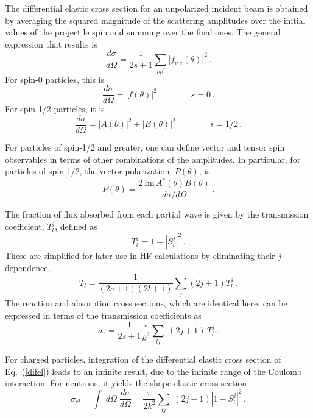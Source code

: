 \documentclass[twocolumn,amsmath,amssymb,10pt,groupedaddress,a4paper]{revtex4}
\begin{document}
The differential elastic cross section for an unpolarized incident
beam is obtained by averaging the squared magnitude of the scattering
amplitudes over the initial values of the projectile spin and summing
over the final ones. The general expression that results is \begin{equation}
\frac{d\sigma}{d\Omega}=\frac{1}{2s+1}\sum_{\nu\nu^{\prime}}\left|f_{\nu^{\prime}\nu}(\theta)\right|^{2}\,.\label{difel}\end{equation}
 For spin-0 particles, this is \begin{equation}
\frac{d\sigma}{d\Omega}=\left|f(\theta)\right|^{2}\qquad\qquad s=0\,.\end{equation}
 For spin-1/2 particles, it is \begin{equation}
\frac{d\sigma}{d\Omega}=\left|A(\theta)\right|^{2}+\left|B(\theta)\right|^{2}\qquad\qquad s=1/2\,.\end{equation}

For particles of spin-1/2 and greater, one can define vector and tensor
spin observables in terms of other combinations of the amplitudes.
In particular, for particles of spin-1/2, the vector polarization,
$P(\theta)$, is \begin{equation}
P(\theta)=\frac{2\,\textrm{Im}\, A^{*}(\theta)B(\theta)}{d\sigma/d\Omega}\,.\end{equation}

The fraction of flux absorbed from each partial wave is given by the
transmission coefficient, $T_{l}^{j}$, defined as \begin{equation}
T_{l}^{j}=1-\left|S_{l}^{j}\right|^{2}\,.\end{equation}
These are simplified for later use in HF calculations by eliminating
their $j$ dependence, \begin{equation}
T_{l}=\frac{1}{(2s+1)(2l+1)}\sum_j (2j+1) T_{l}^{j}\,.\end{equation}
The reaction and absorption cross sections, which are identical here,
can be expressed in terms of the transmission coefficients as \begin{equation}
\sigma_{r}=\frac{1}{2s+1}\frac{\pi}{k^{2}}\sum_{lj}\;(2j+1)\, T_{l}^{j}\,.\end{equation}

For charged particles, integration of the differential elastic cross
section of Eq.~(\ref{difel}) leads to an infinite result, due to
the infinite range of the Coulomb interaction. For neutrons, it yields
the shape elastic cross section, \begin{equation}
\sigma_{el}=\int\; d\Omega\;\frac{d\sigma}{d\Omega}=\frac{\pi}{2k^{2}}\sum_{lj}\;(2j+1)\left|1-S_{l}^{j}\right|^{2}\,.\end{equation}
\end{document}
